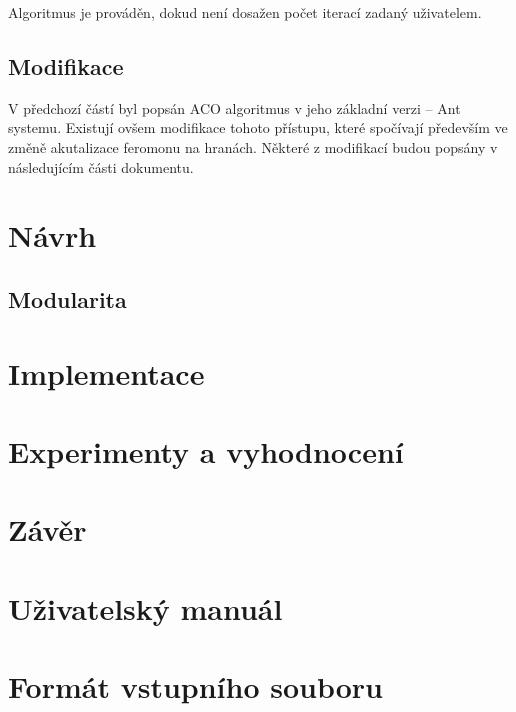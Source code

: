 \documentclass[a4paper, 12pt]{article}
\begin{document}
Algoritmus je prováděn, dokud není dosažen počet iterací zadaný uživatelem.


\subsection{Modifikace}
\label{subsec:modif}
V předchozí částí byl popsán ACO algoritmus v jeho základní verzi -- Ant systemu. Existují ovšem modifikace tohoto přístupu, které spočívají především ve změně
akutalizace feromonu na hranách. Některé z modifikací budou popsány v následujícím části dokumentu.
\section{Návrh}
\label{sec:design}
\subsection{Modularita}
\label{subsec:modularity}

\section{Implementace}
\label{sec:implementation}

\section{Experimenty a vyhodnocení}
\label{sec:eval}

\section{Závěr}
\label{sec:concl}

\appendix
\section{Uživatelský manuál}
\label{app:help}
\section{Formát vstupního souboru}
\label{app:format}

\newpage


\end{document}

